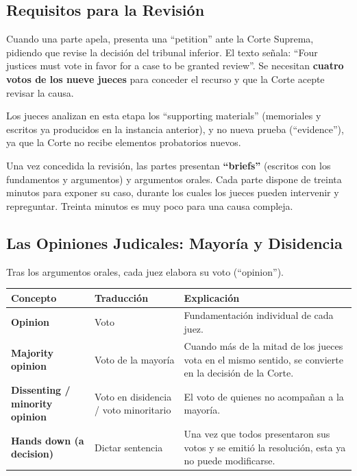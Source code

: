 \documentclass[12pt,oneside]{book}
\begin{document}
\subsection{Requisitos para la Revisión}

Cuando una parte apela, presenta una ``petition'' ante la Corte Suprema, pidiendo que revise la decisión del tribunal inferior. El texto señala: ``Four justices must vote in favor for a case to be granted review''. Se necesitan \textbf{cuatro votos de los nueve jueces} para conceder el recurso y que la Corte acepte revisar la causa.

Los jueces analizan en esta etapa los ``supporting materials'' (memoriales y escritos ya producidos en la instancia anterior), y no nueva prueba (``evidence''), ya que la Corte no recibe elementos probatorios nuevos.

Una vez concedida la revisión, las partes presentan \textbf{``briefs''} (escritos con los fundamentos y argumentos) y argumentos orales. Cada parte dispone de treinta minutos para exponer su caso, durante los cuales los jueces pueden intervenir y repreguntar. Treinta minutos es muy poco para una causa compleja.

\subsection{Las Opiniones Judicales: Mayoría y Disidencia}

Tras los argumentos orales, cada juez elabora su voto (``opinion'').

\begin{table}[H]
\centering
\begin{tabularx}{\textwidth}{p{2.5cm} X X}
\toprule
\textbf{Concepto} & \textbf{Traducción} & \textbf{Explicación} \\
\midrule
\textbf{Opinion} & Voto & Fundamentación individual de cada juez. \\
\midrule
\textbf{Majority opinion} & Voto de la mayoría & Cuando más de la mitad de los jueces vota en el mismo sentido, se convierte en la decisión de la Corte. \\
\midrule
\textbf{Dissenting / minority opinion} & Voto en disidencia / voto minoritario & El voto de quienes no acompañan a la mayoría. \\
\midrule
\textbf{Hands down (a decision)} & Dictar sentencia & Una vez que todos presentaron sus votos y se emitió la resolución, esta ya no puede modificarse. \\
\bottomrule
\end{tabularx}
\end{table}
\end{document}
